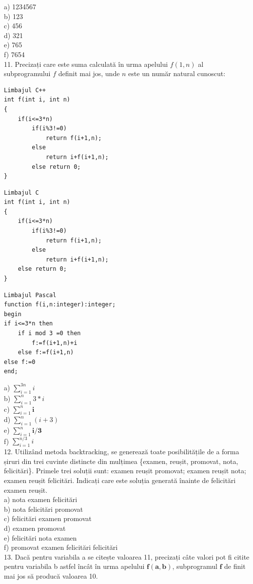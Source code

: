 \documentclass[10pt]{article}
\begin{document}
a) 1234567\\
b) 123\\
c) 456\\
d) 321\\
e) 765\\
f) 7654\\
11. Precizați care este suma calculată în urma apelului $f(1, n)$ al subprogramului $f$ definit mai jos, unde $n$ este un număr natural cunoscut:

\begin{verbatim}
Limbajul C++
int f(int i, int n)
{
    if(i<=3*n)
        if(i%3!=0)
            return f(i+1,n);
        else
            return i+f(i+1,n);
        else return 0;
}
\end{verbatim}

\begin{verbatim}
Limbajul C
int f(int i, int n)
{
    if(i<=3*n)
        if(i%3!=0)
            return f(i+1,n);
        else
            return i+f(i+1,n);
    else return 0;
}
\end{verbatim}

\begin{verbatim}
Limbajul Pascal
function f(i,n:integer):integer;
begin
if i<=3*n then
    if i mod 3 =0 then
        f:=f(i+1,n)+i
    else f:=f(i+1,n)
else f:=0
end;
\end{verbatim}

a) $\sum_{i=1}^{3 n} i$\\
b) $\sum_{i=1}^{n} 3 * i$\\
c) $\sum_{i=1}^{n} \boldsymbol{i}$\\
d) $\sum_{i=1}^{n}(i+3)$\\
e) $\sum_{i=1}^{n} \boldsymbol{i} / \mathbf{3}$\\
f) $\sum_{i=1}^{n / 3} i$\\
12. Utilizând metoda backtracking, se generează toate posibilitățile de a forma șiruri din trei cuvinte distincte din mulțimea \{examen, reușit, promovat, nota, felicitări\}. Primele trei soluții sunt: examen reușit promovat; examen reușit nota; examen reușit felicitări. Indicați care este soluția generată înainte de felicitări examen reușit.\\
a) nota examen felicitări\\
b) nota felicitări promovat\\
c) felicitări examen promovat\\
d) examen promovat\\
e) felicitări nota examen\\
f) promovat examen felicitări felicitări\\
13. Dacă pentru variabila a se citește valoarea 11, precizați câte valori pot fi citite pentru variabila b astfel încât în urma apelului $\mathbf{f}(\mathbf{a}, \mathbf{b})$, subprogramul $\mathbf{f}$ de finit mai jos să producă valoarea 10.
\end{document}
